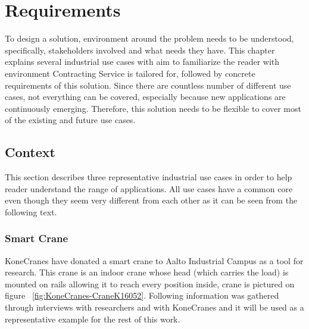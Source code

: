 \chapter{Requirements}
\label{chapter:requirements}

To design a solution, environment around the problem needs to be understood, specifically, stakeholders involved and what needs they have. This chapter explains several industrial use cases with aim to familiarize the reader with environment Contracting Service is tailored for, followed by concrete requirements of this solution. Since there are countless number of different use cases, not everything can be covered, especially because new applications are continuously emerging. Therefore, this solution needs to be flexible to cover most of the existing and future use cases.  

\section{Context}
\label{section:context}

This section describes three representative industrial use cases in order to help reader understand the range of applications. All use cases have a common core even though they seem very different from each other as it can be seen from the following text.

\subsection{Smart Crane}

KoneCranes have donated a smart crane to Aalto Industrial Campus as a tool for research. This crane is an indoor crane whose head (which carries the load) is mounted on rails allowing it to reach every position inside, crane is pictured on figure ~\ref{fig:KoneCranes-CraneK16052}. Following information was gathered through interviews with researchers and with KoneCranes and it will be used as a representative example for the rest of this work.

